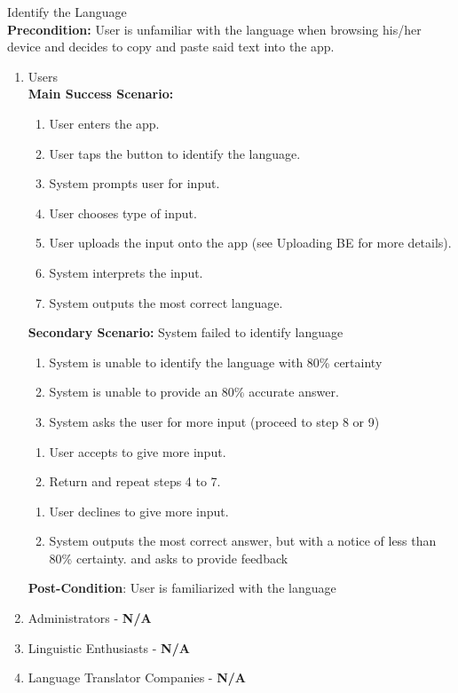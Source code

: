 \item Identify the Language \\
	\textbf{Precondition:} User is unfamiliar with the language when browsing his/her device and decides to copy and paste said text into the app.
	\begin{enumerate}[{\bf VP1:}]
		\item Users \\
				\textbf{Main Success Scenario:}
					\begin{enumerate}[{\bf 1.}]
						\item User enters the app.
						\item User taps the button to identify the language.
							\item System prompts user for input.
							\item User chooses type of input.
							\item User uploads the input onto the app (see Uploading BE for more details).
							\item System interprets the input.
							\item System outputs the most correct language.
					\end{enumerate}
					\textbf{Secondary Scenario:} System failed to identify language
					\begin{enumerate}[{\bf 7.}i.]
						\item  System is unable to identify the language with 80\% certainty
						\item System is unable to provide an 80\% accurate answer.
						\item System asks the user for more input (proceed to step 8 or 9)
					\end{enumerate}
					
					\begin{enumerate}[{\bf 8.}i.]
						\item User accepts to give more input.
						\item Return and repeat steps 4 to 7.
					\end{enumerate}
					\begin{enumerate}[{\bf 9}i.]
						\item User declines to give more input.
						\item System outputs the most correct answer, but with a notice of less than 80\% certainty. and asks to provide feedback
					\end{enumerate}
					\textbf{Post-Condition}: User is familiarized with the language 
			\item Administrators - \textbf{N/A}
			\item Linguistic Enthusiasts - \textbf{N/A}
			\item Language Translator Companies - \textbf{N/A}
		\end{enumerate}
